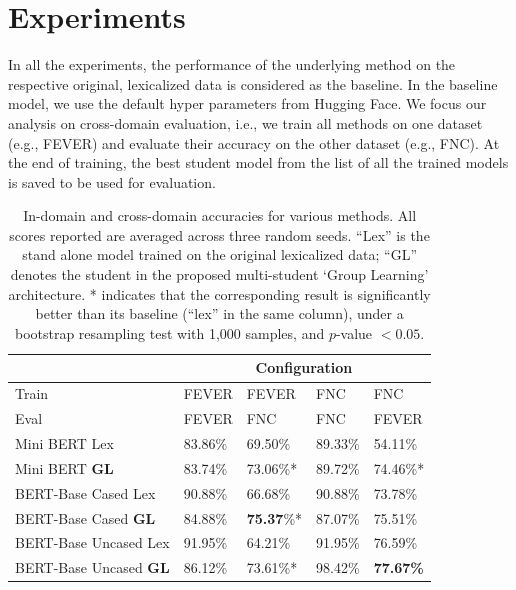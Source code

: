 \section{Experiments}
In all the experiments, the performance of the underlying method on the respective original, lexicalized data is considered as the baseline. In the baseline model, we use the default hyper parameters from Hugging Face. 
We focus our analysis on cross-domain evaluation, i.e., we train all methods on one dataset  (e.g., FEVER) and evaluate their accuracy on the other dataset (e.g., FNC). At the end of training, the best student model from the list of all the trained models is saved to be used for evaluation.



\begin{table}[h]
\begin{center}
\footnotesize
\begin{tabular}{p{20mm}p{9mm}p{9mm}|p{9mm}p{9mm}}
\toprule
& \multicolumn{4}{c}{Configuration} \\
\midrule
Train  & {FEVER}&{FEVER}&{FNC}&{{FNC}} \\
Eval  & {FEVER}&{{FNC}}&{FNC}&{{FEVER}} \\
\midrule
Mini BERT Lex &83.86\%&69.50\%&89.33\%&54.11\%\\
Mini BERT \bf{GL} &83.74\%&{73.06\%*}&89.72\%&{74.46\%*}\\
\midrule
BERT-Base Cased Lex&90.88\%&66.68\%&90.88\%&73.78\%\\
BERT-Base Cased \bf{GL}&84.88\%&{\textbf{75.37}\%*}&87.07\%&75.51\%\\
\midrule
BERT-Base Uncased Lex&91.95\%&64.21\%&91.95\%&76.59\%\\
BERT-Base Uncased \bf{GL} &86.12\%&{73.61\%*}&98.42\%&\textbf{77.67\%}\\

\bottomrule
\end{tabular}
\end{center}
\caption{ In-domain and cross-domain accuracies for various methods.
All scores reported are averaged across three random seeds.
``Lex'' is the stand alone model trained on the original lexicalized data;  ``GL'' denotes the student in the proposed multi-student `Group Learning' architecture. * indicates that the corresponding result is significantly better than its baseline (``lex'' in the same column), under a bootstrap resampling test with 1,000 samples, and $p$-value $< 0.05$. }
\label{results_fnc}
\vspace*{-5mm}
\end{table}


